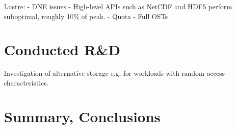 \documentclass{superfri}
\numberwithin{equation}{section}
\begin{document}
Lustre:
- DNE issues
- High-level APIs such as NetCDF and HDF5 perform suboptimal, roughly 10\% of peak.
- Quota
- Full OSTs

\section{Conducted R\&D}
\label{sec:randd}

Investigation of alternative storage e.g. for workloads with random-access characteristics.

\section{Summary, Conclusions}
\label{sec:summary}




\end{document}
